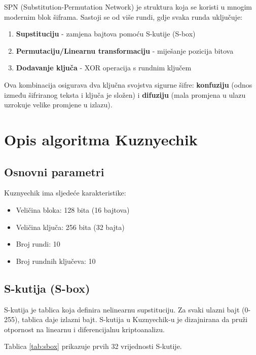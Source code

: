 \documentclass[12pt,a4paper]{article}
\begin{document}
SPN (Substitution-Permutation Network) je struktura koja se koristi u mnogim modernim blok šiframa. Sastoji se od više rundi, gdje svaka runda uključuje:

\begin{enumerate}
    \item \textbf{Supstituciju} - zamjena bajtova pomoću S-kutije (S-box)
    \item \textbf{Permutaciju/Linearnu transformaciju} - miješanje pozicija bitova
    \item \textbf{Dodavanje ključa} - XOR operacija s rundnim ključem
\end{enumerate}

Ova kombinacija osigurava dva ključna svojstva sigurne šifre: \textbf{konfuziju} (odnos između šifriranog teksta i ključa je složen) i \textbf{difuziju} (mala promjena u ulazu uzrokuje velike promjene u izlazu).

\newpage
\section{Opis algoritma Kuznyechik}

\subsection{Osnovni parametri}

Kuznyechik ima sljedeće karakteristike:
\begin{itemize}
    \item Veličina bloka: 128 bita (16 bajtova)
    \item Veličina ključa: 256 bita (32 bajta)
    \item Broj rundi: 10
    \item Broj rundnih ključeva: 10
\end{itemize}

\subsection{S-kutija (S-box)}

S-kutija je tablica koja definira nelinearnu supstituciju. Za svaki ulazni bajt (0-255), tablica daje izlazni bajt. S-kutija u Kuznyechik-u je dizajnirana da pruži otpornost na linearnu i diferencijalnu kriptoanalizu.

Tablica \ref{tab:sbox} prikazuje prvih 32 vrijednosti S-kutije.
\end{document}
